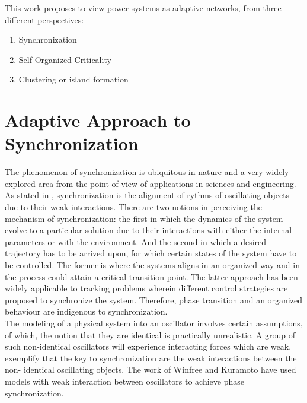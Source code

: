 \documentclass{ifacconf}
\begin{document}
This work proposes to view power systems as adaptive networks, from three different perspectives:
\begin{enumerate}
\item Synchronization
\item Self-Organized Criticality
\item Clustering or island formation
\end{enumerate}
\section{Adaptive Approach to Synchronization}
The phenomenon of synchronization is ubiquitous in nature and a very widely explored area from the point of view of applications in sciences and engineering. As stated in \citep{Pikov}, synchronization is the alignment of rythms of oscillating objects due to their weak interactions. There are two notions in perceiving the mechanism of synchronization: the first in which the dynamics of the system evolve to a particular solution due to their interactions with either the internal parameters or with the environment. And the second in which a desired trajectory has to be arrived upon, for which certain states of the system have to be controlled. The former is where the systems aligns in an organized way and in the process could attain a critical transition point. The latter approach has been widely applicable to tracking problems wherein different control strategies are proposed to synchronize the system. Therefore, phase transition and an organized behaviour are indigenous to synchronization. \\
 The modeling of a physical system into an oscillator involves certain assumptions, of which, the notion that they are identical is practically unrealistic.  A group of such non-identical oscillators will experience interacting forces which are weak. \citep{Weak} exemplify that the key to synchronization are the weak interactions between the non- identical oscillating objects. The work of Winfree and Kuramoto have used models with weak interaction between oscillators to achieve phase synchronization. \\
\end{document}
